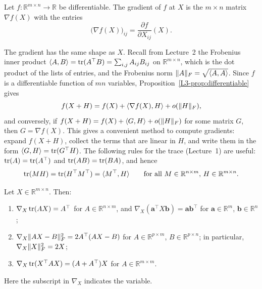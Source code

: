 \begin{definition}\label{L3-def:matrix-gradient}
    Let $f: \mathbb{R}^{m \times n} \to \mathbb{R}$ be differentiable. The gradient of $f$ at $X$ is the $m \times n$ matrix $\nabla f(X)$ with the entries
    \[\big(\nabla f(X)\big)_{ij} = \frac{\partial f}{\partial X_{ij}}(X).\]
\end{definition}

The gradient has the same shape as $X$. Recall from Lecture~2 the Frobenius inner product $\langle A, B \rangle = \operatorname{tr}(A^\top B) = \sum_{i, j} A_{ij} B_{ij}$ on $\mathbb{R}^{m \times n}$, which is the dot product of the lists of entries, and the Frobenius norm $\lVert A \rVert_F = \sqrt{\langle A, A \rangle}$. Since $f$ is a differentiable function of $mn$ variables, Proposition~\ref{L3-prop:differentiable} gives
\[f(X + H) = f(X) + \langle \nabla f(X), H \rangle + o(\lVert H \rVert_F),\]
and conversely, if $f(X + H) = f(X) + \langle G, H \rangle + o(\lVert H \rVert_F)$ for some matrix $G$, then $G = \nabla f(X)$. This gives a convenient method to compute gradients: expand $f(X + H)$, collect the terms that are linear in $H$, and write them in the form $\langle G, H \rangle = \operatorname{tr}(G^\top H)$. The following rules for the trace (Lecture~1) are useful: $\operatorname{tr}(A) = \operatorname{tr}(A^\top)$ and $\operatorname{tr}(AB) = \operatorname{tr}(BA)$, and hence
\[\operatorname{tr}(MH) = \operatorname{tr}(H^\top M^\top) = \langle M^\top, H \rangle \qquad \text{for all } M \in \mathbb{R}^{n \times m}, \, H \in \mathbb{R}^{m \times n}.\]

\begin{proposition}\label{L3-prop:matrix-gradients}
    Let $X \in \mathbb{R}^{m \times n}$. Then:
    \begin{enumerate}
        \item $\nabla_X \operatorname{tr}(AX) = A^\top$ for $A \in \mathbb{R}^{n \times m}$, and $\nabla_X (\mathbf{a}^\top X \mathbf{b}) = \mathbf{a}\mathbf{b}^\top$ for $\mathbf{a} \in \mathbb{R}^m$, $\mathbf{b} \in \mathbb{R}^n$;
        \item $\nabla_X \lVert AX - B \rVert_F^2 = 2A^\top(AX - B)$ for $A \in \mathbb{R}^{p \times m}$, $B \in \mathbb{R}^{p \times n}$; in particular, $\nabla_X \lVert X \rVert_F^2 = 2X$;
        \item $\nabla_X \operatorname{tr}(X^\top A X) = (A + A^\top)X$ for $A \in \mathbb{R}^{m \times m}$.
    \end{enumerate}
    Here the subscript in $\nabla_X$ indicates the variable.
\end{proposition}

